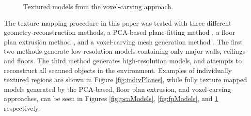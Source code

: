 \documentclass[]{spie}  %
\begin{document}
\begin{figure}
  \caption{Textured models from the voxel-carving approach.}
  \label{fig:voxelModels}
\end{figure}



The texture mapping procedure in this paper was tested with three
different geometry-reconstruction methods, a PCA-based plane-fitting
method \cite{sanchez2012point}, a floor plan extrusion method
\cite{turnerfloorplan}, and a voxel-carving mesh generation method
\cite{turnerwatertight}. The first two methods generate low-resolution
models containing only major walls, ceilings and floors. The third
method generates high-resolution models, and attempts to reconstruct
all scanned objects in the environment. Examples of individually
textured regions are shown in Figure \ref{fig:indivPlanes}, while
fully texture mapped models generated by the PCA-based, floor plan
extrusion, and voxel-carving approaches, can be seen in Figures
\ref{fig:pcaModels}, \ref{fig:fpModels}, and \ref{fig:voxelModels}
respectively.
\end{document}

